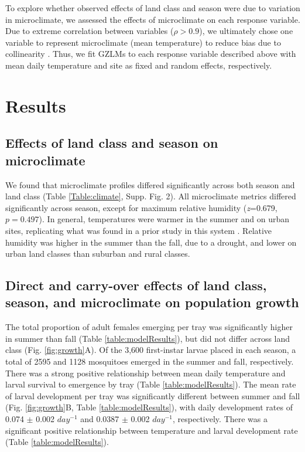 \documentclass[12pt]{article}
\begin{document}
To explore whether observed effects of land class and season were due to variation in microclimate, we assessed the effects of microclimate on each response variable. Due to extreme correlation between variables ($\rho>0.9$), we ultimately chose one variable to represent microclimate (mean temperature) to reduce bias due to collinearity \citep{graham2003}. Thus, we fit GZLMs to each response variable described above with mean daily temperature and site as fixed and random effects, respectively.

\section{Results}

\subsection{Effects of land class and season on microclimate}

We found that microclimate profiles differed significantly across both season and land class (Table \ref{Table:climate}, Supp. Fig. 2). All microclimate metrics differed significantly across season, except for maximum relative humidity (\textit{z}=0.679, $p=0.497$). In general, temperatures were warmer in the summer and on urban sites, replicating what was found in a prior study in this system \citep{murdock2017}. Relative humidity was higher in the summer than the fall, due to a drought, and lower on urban land classes than suburban and rural classes.

\subsection{Direct and carry-over effects of land class, season, and microclimate on population growth}

The total proportion of adult females emerging per tray was significantly higher in summer than fall (Table \ref{table:modelResults}), but did not differ across land class (Fig. \ref{fig:growth}A). Of the 3,600 first-instar larvae placed in each season, a total of 2595 and 1128 mosquitoes emerged in the summer and fall, respectively. There was a strong positive relationship between mean daily temperature and larval survival to emergence by tray (Table \ref{table:modelResults}). The mean rate of larval development per tray was significantly different between summer and fall (Fig. \ref{fig:growth}B, Table \ref{table:modelResults}), with daily development rates of 0.074 $\pm$ 0.002 $day^{-1}$ and 0.0387 $\pm$ 0.002 $day^{-1}$, respectively. There was a significant positive relationship between temperature and larval development rate (Table \ref{table:modelResults}).
\end{document}
